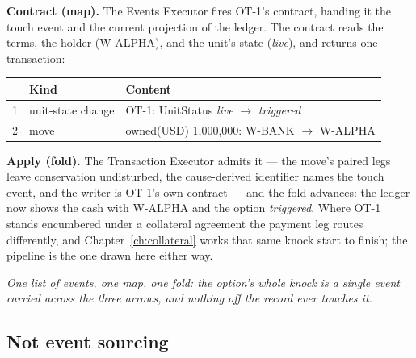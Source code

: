 \textbf{Contract (map).} The Events Executor fires OT-1's contract, handing it the touch
event and the current projection of the ledger. The contract reads the terms, the holder
(\mbox{W-ALPHA}), and the unit's state (\emph{live}), and
returns one transaction:

\begin{center}
\begin{tabular}{@{}rll@{}}
\toprule
 & Kind & Content \\
\midrule
1 & unit-state change & OT-1: UnitStatus \emph{live} $\to$ \emph{triggered} \\
2 & move & owned(USD) 1{,}000{,}000: W-BANK $\to$ W-ALPHA \\
\bottomrule
\end{tabular}
\end{center}

\textbf{Apply (fold).} The Transaction Executor admits it --- the move's paired legs leave
conservation undisturbed, the cause-derived identifier names the touch event, and the
writer is OT-1's own contract --- and the fold advances: the ledger now shows the cash with
\mbox{W-ALPHA} and the option \emph{triggered}. Where OT-1 stands encumbered under a
collateral agreement the payment leg routes differently, and Chapter~\ref{ch:collateral}
works that same knock start to finish; the pipeline is the one drawn here either way.

\emph{One list of events, one map, one fold: the option's whole knock is a single event
carried across the three arrows, and nothing off the record ever touches it.}

\subsection{Not event sourcing}

